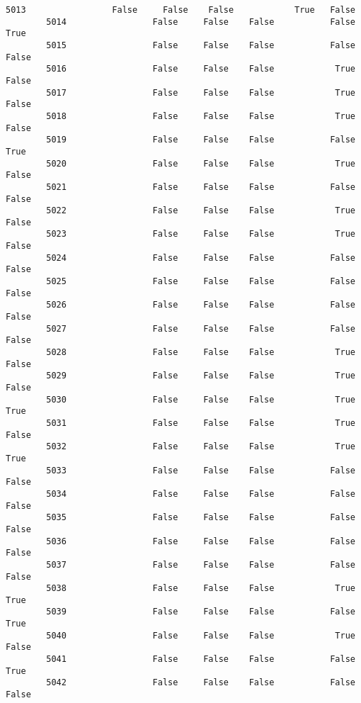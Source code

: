 \documentclass[11pt]{article}
\begin{document}
\begin{Verbatim}[commandchars=\\\{\}]
        5013                 False     False    False            True   False   
        5014                 False     False    False           False    True   
        5015                 False     False    False           False   False   
        5016                 False     False    False            True   False   
        5017                 False     False    False            True   False   
        5018                 False     False    False            True   False   
        5019                 False     False    False           False    True   
        5020                 False     False    False            True   False   
        5021                 False     False    False           False   False   
        5022                 False     False    False            True   False   
        5023                 False     False    False            True   False   
        5024                 False     False    False           False   False   
        5025                 False     False    False           False   False   
        5026                 False     False    False           False   False   
        5027                 False     False    False           False   False   
        5028                 False     False    False            True   False   
        5029                 False     False    False            True   False   
        5030                 False     False    False            True    True   
        5031                 False     False    False            True   False   
        5032                 False     False    False            True    True   
        5033                 False     False    False           False   False   
        5034                 False     False    False           False   False   
        5035                 False     False    False           False   False   
        5036                 False     False    False           False   False   
        5037                 False     False    False           False   False   
        5038                 False     False    False            True    True   
        5039                 False     False    False           False    True   
        5040                 False     False    False            True   False   
        5041                 False     False    False           False    True   
        5042                 False     False    False           False   False   
        

\end{Verbatim}
\end{document}
